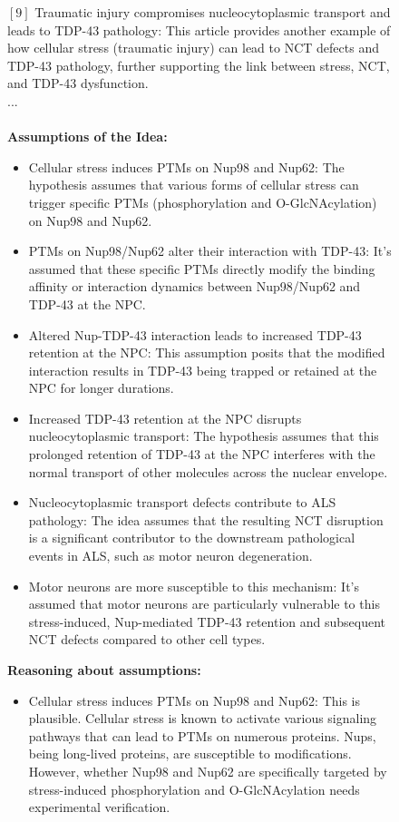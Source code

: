 \begin{figure}[htbp!]
\begin{tcolorbox}
$[9]$ Traumatic injury compromises nucleocytoplasmic transport and leads to TDP-43 pathology: This article provides another example of how cellular stress (traumatic injury) can lead to NCT defects and TDP-43 pathology, further supporting the link between stress, NCT, and TDP-43 dysfunction.\\
...\\
\\
\textbf{Assumptions of the Idea:}
\begin{itemize}
    \item Cellular stress induces PTMs on Nup98 and Nup62: The hypothesis assumes that various forms of cellular stress can trigger specific PTMs (phosphorylation and O-GlcNAcylation) on Nup98 and Nup62.
    \item PTMs on Nup98/Nup62 alter their interaction with TDP-43: It's assumed that these specific PTMs directly modify the binding affinity or interaction dynamics between Nup98/Nup62 and TDP-43 at the NPC.
    \item Altered Nup-TDP-43 interaction leads to increased TDP-43 retention at the NPC: This assumption posits that the modified interaction results in TDP-43 being trapped or retained at the NPC for longer durations.
    \item Increased TDP-43 retention at the NPC disrupts nucleocytoplasmic transport: The hypothesis assumes that this prolonged retention of TDP-43 at the NPC interferes with the normal transport of other molecules across the nuclear envelope.
    \item Nucleocytoplasmic transport defects contribute to ALS pathology: The idea assumes that the resulting NCT disruption is a significant contributor to the downstream pathological events in ALS, such as motor neuron degeneration.
    \item Motor neurons are more susceptible to this mechanism: It's assumed that motor neurons are particularly vulnerable to this stress-induced, Nup-mediated TDP-43 retention and subsequent NCT defects compared to other cell types.
\end{itemize}
\textbf{Reasoning about assumptions:}
\begin{itemize}
    \item Cellular stress induces PTMs on Nup98 and Nup62: This is plausible. Cellular stress is known to activate various signaling pathways that can lead to PTMs on numerous proteins. Nups, being long-lived proteins, are susceptible to modifications. However, whether Nup98 and Nup62 are specifically targeted by stress-induced phosphorylation and O-GlcNAcylation needs experimental verification.

\end{itemize}
\end{tcolorbox}
\end{figure}
